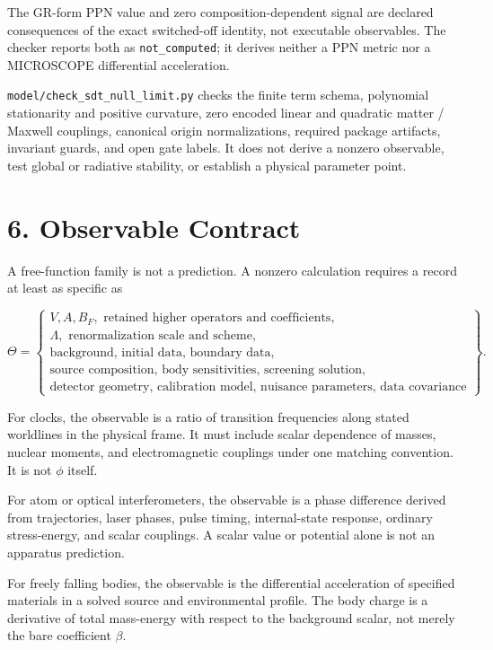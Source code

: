\documentclass[
  american,
  11pt,
  letterpaper,
]{article}
\begin{document}
The GR-form PPN value and zero composition-dependent signal are declared consequences of the exact switched-off identity, not executable observables. The checker reports both as \texttt{not\_computed}; it derives neither a PPN metric nor a MICROSCOPE differential acceleration.

\nolinkurl{model/check_sdt_null_limit.py} checks the finite term schema, polynomial stationarity and positive curvature, zero encoded linear and quadratic matter / Maxwell couplings, canonical origin normalizations, required package artifacts, invariant guards, and open gate labels. It does not derive a nonzero observable, test global or radiative stability, or establish a physical parameter point.

\section{6. Observable Contract}\label{observable-contract}

A free-function family is not a prediction. A nonzero calculation requires a record at least as specific as

\begin{equation}
\Theta=\left\{
\begin{array}{l}
V,A,B_F,\text{ retained higher operators and coefficients},\\
\Lambda,\text{ renormalization scale and scheme},\\
\text{background, initial data, boundary data},\\
\text{source composition, body sensitivities, screening solution},\\
\text{detector geometry, calibration model, nuisance parameters, data covariance}
\end{array}
\right\}.
\tag{23}
\end{equation}

For clocks, the observable is a ratio of transition frequencies along stated worldlines in the physical frame. It must include scalar dependence of masses, nuclear moments, and electromagnetic couplings under one matching convention. It is not \(\phi\) itself.

For atom or optical interferometers, the observable is a phase difference derived from trajectories, laser phases, pulse timing, internal-state response, ordinary stress-energy, and scalar couplings. A scalar value or potential alone is not an apparatus prediction.

For freely falling bodies, the observable is the differential acceleration of specified materials in a solved source and environmental profile. The body charge is a derivative of total mass-energy with respect to the background scalar, not merely the bare coefficient \(\beta\).
\end{document}
